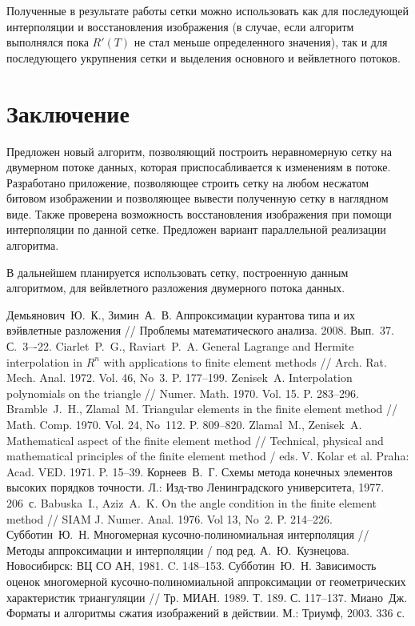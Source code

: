 \documentclass{spisok-article}
\begin{document}
Полученные в результате работы сетки можно использовать как для последующей интерполяции и восстановления изображения (в случае, если алгоритм выполнялся пока $R'(T)$ не стал меньше определенного значения), так и для последующего укрупнения сетки и выделения основного и вейвлетного потоков. 

\section{Заключение}

Предложен новый алгоритм, позволяющий построить неравномерную сетку на двумерном потоке данных, которая приспосабливается к изменениям в потоке. Разработано приложение, позволяющее строить сетку на любом несжатом битовом
изображении и позволяющее вывести полученную сетку в наглядном виде.
Также проверена возможность восстановления изображения при помощи интерполяции по данной сетке.
Предложен вариант параллельной реализации алгоритма.

В дальнейшем планируется использовать сетку, построенную данным алгоритмом, для вейвлетного разложения
двумерного потока данных.

\renewcommand\refname{Литература}
\begin{thebibliography}{10}
 Демьянович~Ю.~К., Зимин~А.~В. Аппроксимации курантова типа и их вэйвлетные разложения // Проблемы математического анализа. 2008. Вып.~37. С.~3–-22.
 Ciarlet~P.~G., Raviart~P.~A. General Lagrange and Hermite interpolation in $R^n$ with applications to finite element methods // Arch. Rat. Mech. Anal. 1972. Vol. 46, No~3. P. 177--199.
 Zenisek~A. Interpolation polynomials on the triangle // Numer. Math. 1970. Vol. 15. P. 283--296.
 Bramble~J.~H., Zlamal~M. Triangular elements in the finite element method // Math. Comp. 1970. Vol. 24, No~112. P. 809--820.
 Zlamal~M., Zenisek~A. Mathematical aspect of the finite element method // Technical, physical and mathematical principles of the finite element method / eds. V. Kolar et al. Praha: Acad. VED. 1971. P. 15--39.
 Корнеев~В.~Г. Схемы метода конечных элементов высоких порядков точности. Л.: Изд-тво Ленинградского университета, 1977. 206~с.
 Babuska~I., Aziz~A.~K. On the angle condition in the finite element method // SIAM J. Numer. Anal. 1976. Vol 13, No~2. P. 214--226.
 Субботин~Ю.~Н. Многомерная кусочно-полиномиальная интерполяция // Методы аппроксимации
и интерполяции / под ред. А.~Ю.~Кузнецова. Новосибирск: ВЦ СО АН, 1981. C. 148--153.
 Субботин~Ю.~Н. Зависимость оценок многомерной кусочно-полиномиальной аппроксимации от
геометрических характеристик триангуляции // Тр. МИАН. 1989. Т. 189. С. 117--137.
 Миано~Дж. Форматы и алгоритмы сжатия изображений в действии. М.: Триумф, 2003. 336 с. 
\end{thebibliography}
\end{document}
